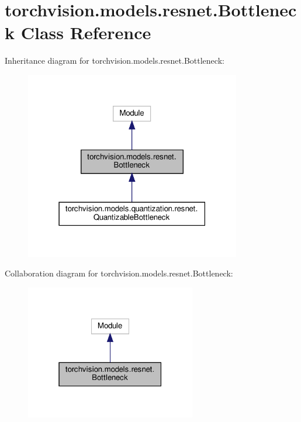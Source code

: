 \hypertarget{classtorchvision_1_1models_1_1resnet_1_1Bottleneck}{}\section{torchvision.\+models.\+resnet.\+Bottleneck Class Reference}
\label{classtorchvision_1_1models_1_1resnet_1_1Bottleneck}


Inheritance diagram for torchvision.\+models.\+resnet.\+Bottleneck\+:
\nopagebreak
\begin{figure}[H]
\begin{center}
\leavevmode
\includegraphics[width=267pt]{classtorchvision_1_1models_1_1resnet_1_1Bottleneck__inherit__graph}
\end{center}
\end{figure}


Collaboration diagram for torchvision.\+models.\+resnet.\+Bottleneck\+:
\nopagebreak
\begin{figure}[H]
\begin{center}
\leavevmode
\includegraphics[width=211pt]{classtorchvision_1_1models_1_1resnet_1_1Bottleneck__coll__graph}
\end{center}
\end{figure}
